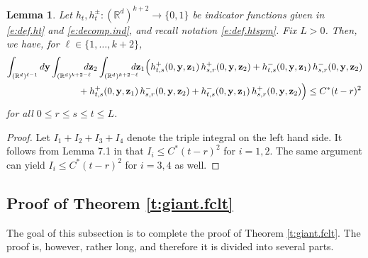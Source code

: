 \documentclass[11pt]{amsart}
\numberwithin{equation}{section}
\theoremstyle{plain}
\newtheorem{lemma}[theorem]{Lemma}
\theoremstyle{definition}
\begin{document}
\begin{lemma}  \label{l:tightness.lemma}
Let $h_t, h_t^{\pm} : ({{\mathbb R}}^d)^{k+2} \to \{ 0,1 \}$ be indicator functions given in \eqref{e:def.ht} and \eqref{e:decomp.ind}, and recall notation \eqref{e:def.htspm}. Fix $L>0$. Then, we have, for $\ell \in \{ 1,\dots,k+2 \}$,
\begin{align*}
\int_{({{\mathbb R}}^d)^{\ell -1}}d {{\bf y}} &\int_{({{\mathbb R}}^d)^{k+2-\ell}}\hspace{-10pt} d {{\bf z}}_2 \int_{({{\mathbb R}}^d)^{k+2-\ell}}\hspace{-10pt}d {{\bf z}}_1 \Bigl( h_{t,s}^+(0,{{\bf y}},{{\bf z}}_1)\, h_{s,r}^+(0,{{\bf y}},{{\bf z}}_2)  + h_{t,s}^-(0,{{\bf y}},{{\bf z}}_1)\,h_{s,r}^-(0,{{\bf y}},{{\bf z}}_2)    \\
&\qquad \quad  + h_{t,s}^+(0,{{\bf y}},{{\bf z}}_1)\, h_{s,r}^-(0,{{\bf y}},{{\bf z}}_2) + h_{t,s}^-(0,{{\bf y}},{{\bf z}}_1)\, h_{s,r}^+(0,{{\bf y}},{{\bf z}}_2) \Bigr) \leq C^*(t-r)^2
\end{align*}
for all $0 \leq r \leq s \leq t \leq L$.
\end{lemma}
\begin{proof}
Let $I_1 + I_2 + I_3 + I_4$ denote the triple integral on the left hand side. It follows from Lemma 7.1 in \cite{owada:2016} that $I_i \leq C^* (t-r)^2$ for $i=1,2$. The same argument can yield $I_i \leq C^* (t-r)^2$ for $i=3,4$ as well.
\end{proof}

\subsection{Proof of Theorem \ref{t:giant.fclt}}  \label{s:proof.third.regime}

The goal of this subsection is to complete the proof of Theorem \ref{t:giant.fclt}. The proof is, however, rather long, and therefore it is divided into several parts.
\end{document}

